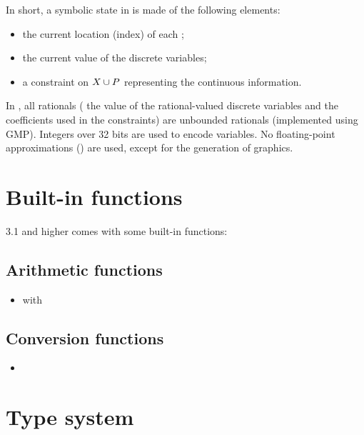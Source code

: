 
In short, a symbolic state in \imitator{} is made of the following elements:
\begin{itemize}
	\item the current location (index) of each \IPTA{};
	\item the current value of the discrete variables;
	\item a constraint on $X \cup P$ representing the continuous information.
\end{itemize}
In \imitator{}, all rationals (\ie{} the value of the rational-valued discrete variables and the coefficients used in the constraints) are unbounded rationals (implemented using GMP).
Integers over 32 bits are used to encode  variables.
No floating-point approximations () are used, except for the generation of graphics.


\section{Built-in functions}\label{section:builtin-functions}

\imitator{} 3.1 and higher comes with some built-in functions:

\subsection{Arithmetic functions}

\begin{itemize}
    \item {} with 
\end{itemize}

\subsection{Conversion functions}

\begin{itemize}
    \item {}
\end{itemize}


\section{Type system}\label{section:type_system}

